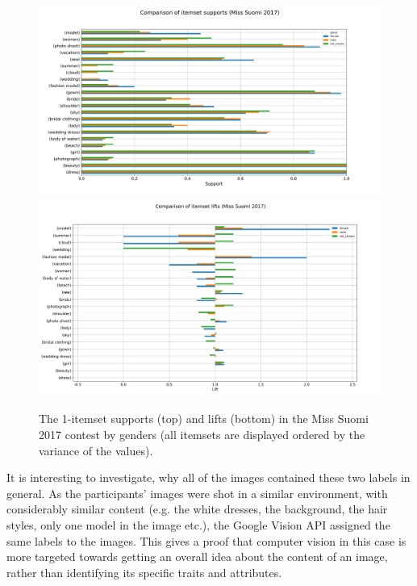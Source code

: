 \begin{figure}[]
    \begin{center}
        \includegraphics[width=1.2\textwidth,center]{Images/itemset_supports-gender-Miss_Helsinki-1_itemset.png}
        \includegraphics[width=1.2\textwidth,center]{Images/itemset_lifts-gender-Miss_Suomi-1_itemsets.png}
        \caption{The 1-itemset supports (top) and lifts (bottom) in the Miss Suomi 2017 contest by genders (all itemsets are displayed ordered by the variance of the values).}
        \label{itemset_supports-gender-Miss_Helsinki-1_itemset}
    \end{center}
\end{figure}

It is interesting to investigate, why all of the images contained these two labels in general. As the participants' images were shot in a similar environment, with considerably similar content (e.g. the white dresses, the background, the hair styles, only one model in the image etc.), the Google Vision API assigned the same labels to the images. This gives a proof that computer vision in this case is more targeted towards getting an overall idea about the content of an image, rather than identifying its specific traits and attributes. 

